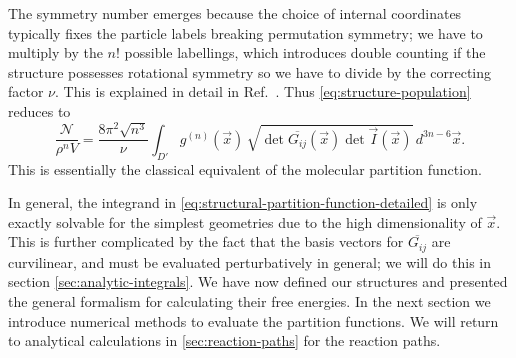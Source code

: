 \documentclass[11pt,twoside]{report}
\begin{document}
The symmetry number emerges because the choice of internal coordinates typically fixes the particle labels breaking permutation symmetry; we have to multiply by the $n!$ possible labellings, which introduces double counting if the structure possesses rotational symmetry so we have to divide by the correcting factor $\nu$.
This is explained in detail in Ref.\ \cite{CatesSM2015}.
Thus \eqref{eq:structure-population} reduces to%
\begin{equation}\label{eq:structural-partition-function-detailed}
  \frac{\mathcal{N}}{\rho^n V}
  =
  \frac{8\pi^2 \sqrt{n^3}}{\nu} \int_{D'}
  g^{(n)}(\vec{x}) \,
  \sqrt{\det{\overline{G_{ij}}(\vec{x})} \det{\vec{I}(\vec{x})}}
  \, d^{3n-6} \vec{x}.
\end{equation}
This is essentially the classical equivalent of the molecular partition function.

In general, the integrand in \eqref{eq:structural-partition-function-detailed} is only exactly solvable for the simplest geometries due to the high dimensionality of $\vec{x}$.
This is further complicated by the fact that the basis vectors for $\overline{G_{ij}}$ are curvilinear, and must be evaluated perturbatively in general; we will do this in section \ref{sec:analytic-integrals}.
We have now defined our structures and presented the general formalism for calculating their free energies.
In the next section we introduce numerical methods to evaluate the partition functions.
We will return to analytical calculations in \ref{sec:reaction-paths} for the reaction paths.

\end{document}
